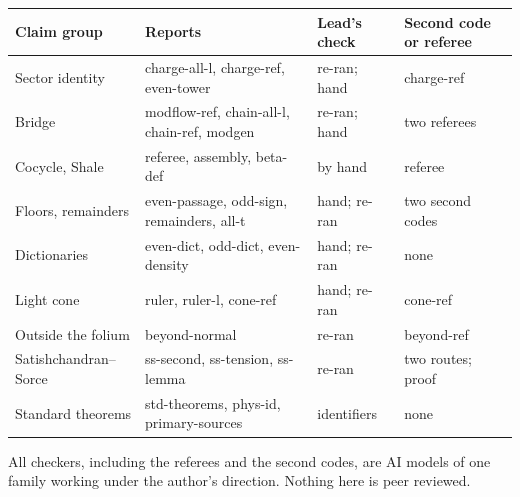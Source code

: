 \documentclass[11pt]{article}
\begin{document}
\begin{center}\footnotesize
\begin{tabular}{lp{}ll}
\toprule
Claim group & Reports & Lead's check & Second code or referee\\
\midrule
Sector identity & charge-all-l, charge-ref, even-tower & re-ran; hand & charge-ref\\
Bridge & modflow-ref, chain-all-l, chain-ref, modgen & re-ran; hand & two referees\\
Cocycle, Shale & referee, assembly, beta-def & by hand & referee\\
Floors, remainders & even-passage, odd-sign, remainders, all-t & hand; re-ran & two second codes\\
Dictionaries & even-dict, odd-dict, even-density & hand; re-ran & none\\
Light cone & ruler, ruler-l, cone-ref & hand; re-ran & cone-ref\\
Outside the folium & beyond-normal & re-ran & beyond-ref\\
Satishchandran--Sorce & ss-second, ss-tension, ss-lemma & re-ran & two routes; proof\\
Standard theorems & std-theorems, phys-id, primary-sources & identifiers & none\\
\bottomrule
\end{tabular}
\end{center}

All checkers, including the referees and the second codes, are AI models of one family working under the author's direction. Nothing here is peer reviewed.
\end{document}
